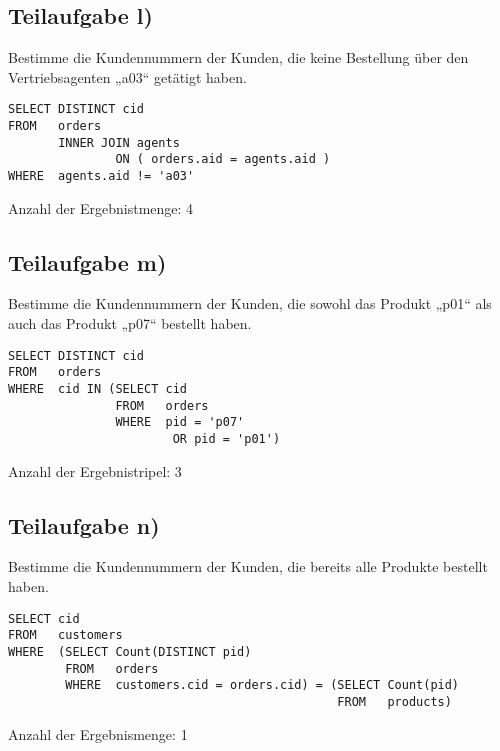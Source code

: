 \subsection{Teilaufgabe l)}
\label{sec:Teilaufgabe l}
Bestimme die Kundennummern der Kunden, die keine Bestellung über den Vertriebsagenten „a03“ getätigt haben. 

\begin{lstlisting}
SELECT DISTINCT cid 
FROM   orders 
       INNER JOIN agents 
               ON ( orders.aid = agents.aid ) 
WHERE  agents.aid != 'a03'  
\end{lstlisting}
Anzahl der Ergebnistmenge: 4


\subsection{Teilaufgabe m)}
\label{sec:Teilaufgabe m}
Bestimme die Kundennummern der Kunden, die sowohl das Produkt „p01“ als auch das Produkt „p07“ bestellt haben. 

\begin{lstlisting}
SELECT DISTINCT cid 
FROM   orders 
WHERE  cid IN (SELECT cid 
               FROM   orders 
               WHERE  pid = 'p07' 
                       OR pid = 'p01')  

\end{lstlisting}
Anzahl der Ergebnistripel: 3

\subsection{Teilaufgabe n)}
\label{sec:Teilaufgabe n}
Bestimme die Kundennummern der Kunden, die bereits alle Produkte bestellt haben. 

\begin{lstlisting}
SELECT cid 
FROM   customers 
WHERE  (SELECT Count(DISTINCT pid) 
        FROM   orders 
        WHERE  customers.cid = orders.cid) = (SELECT Count(pid) 
                                              FROM   products)  

\end{lstlisting}
Anzahl der Ergebnismenge: 1
